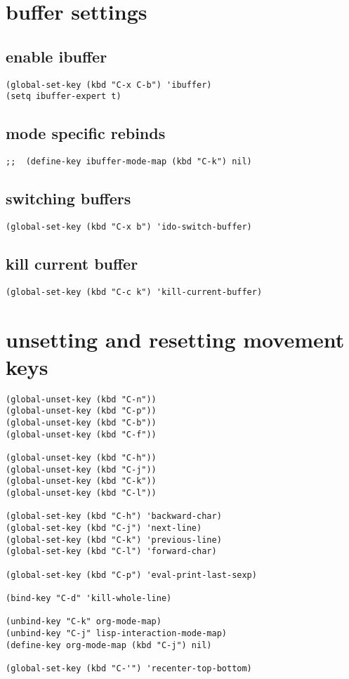 \documentclass[11pt]{article}
\begin{document}
\section{buffer settings}
\label{sec:org28c2450}
\subsection{enable ibuffer}
\label{sec:org42384ec}
\begin{verbatim}
(global-set-key (kbd "C-x C-b") 'ibuffer)
(setq ibuffer-expert t)
\end{verbatim}
\subsection{mode specific rebinds}
\label{sec:org192cba3}
\begin{verbatim}
;;  (define-key ibuffer-mode-map (kbd "C-k") nil)
\end{verbatim}
\subsection{switching buffers}
\label{sec:org80897fc}
\begin{verbatim}
(global-set-key (kbd "C-x b") 'ido-switch-buffer)
\end{verbatim}
\subsection{kill current buffer}
\label{sec:org6afc373}
\begin{verbatim}
(global-set-key (kbd "C-c k") 'kill-current-buffer)
\end{verbatim}
\section{unsetting and resetting movement keys}
\label{sec:org20ec44e}
\begin{verbatim}
(global-unset-key (kbd "C-n"))
(global-unset-key (kbd "C-p"))
(global-unset-key (kbd "C-b"))
(global-unset-key (kbd "C-f"))

(global-unset-key (kbd "C-h"))
(global-unset-key (kbd "C-j"))
(global-unset-key (kbd "C-k"))
(global-unset-key (kbd "C-l"))

(global-set-key (kbd "C-h") 'backward-char)
(global-set-key (kbd "C-j") 'next-line)
(global-set-key (kbd "C-k") 'previous-line)
(global-set-key (kbd "C-l") 'forward-char)

(global-set-key (kbd "C-p") 'eval-print-last-sexp)

(bind-key "C-d" 'kill-whole-line)

(unbind-key "C-k" org-mode-map)
(unbind-key "C-j" lisp-interaction-mode-map)
(define-key org-mode-map (kbd "C-j") nil)

(global-set-key (kbd "C-'") 'recenter-top-bottom)
\end{verbatim}
\end{document}
